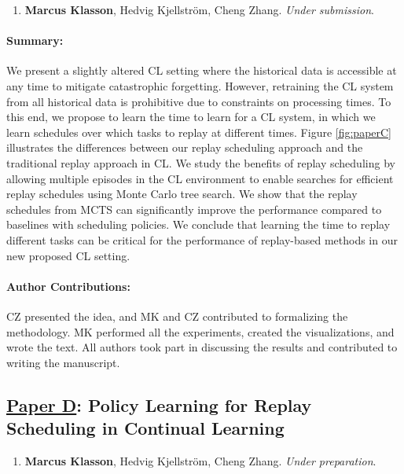 \begin{enumerate}
	\item[] \textbf{Marcus Klasson}, Hedvig Kjellström, Cheng Zhang. \textit{Under submission}. %
\end{enumerate}

\vspace{-3mm}
\paragraph{Summary:} We present a slightly altered CL setting where the historical data is accessible at any time to mitigate catastrophic forgetting. However, retraining the CL system from all historical data is prohibitive due to constraints on processing times. To this end, we propose to learn the time to learn for a CL system, in which we learn schedules over which tasks to replay at different times. Figure \ref{fig:paperC} illustrates the differences between our replay scheduling approach and the traditional replay approach in CL. We study the benefits of replay scheduling by allowing multiple episodes in the CL environment to enable searches for efficient replay schedules using Monte Carlo tree search. We show that the replay schedules from MCTS can significantly improve the performance compared to baselines with scheduling policies. We conclude that learning the time to replay different tasks can be critical for the performance of replay-based methods in our new proposed CL setting. 

\vspace{-3mm}
\paragraph{Author Contributions:} CZ presented the idea, and MK and CZ contributed to formalizing the methodology. MK performed all the experiments, created the visualizations, and wrote the text. All authors took part in discussing the results and contributed to writing the manuscript. 


\subsection{\underline{Paper D}: %
	Policy Learning for Replay Scheduling in Continual Learning}


\begin{enumerate}
	\item[] \textbf{Marcus Klasson}, Hedvig Kjellström, Cheng Zhang. \textit{Under preparation}.%
\end{enumerate}


